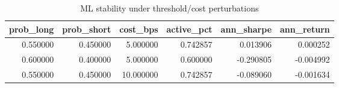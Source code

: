 \begin{table}
\caption{ML stability under threshold/cost perturbations}
\label{tab:7_9}
\begin{tabular}{rrrrrr}
\toprule
prob_long & prob_short & cost_bps & active_pct & ann_sharpe & ann_return \\
\midrule
0.550000 & 0.450000 & 5.000000 & 0.742857 & 0.013906 & 0.000252 \\
0.600000 & 0.400000 & 5.000000 & 0.600000 & -0.290805 & -0.004992 \\
0.550000 & 0.450000 & 10.000000 & 0.742857 & -0.089060 & -0.001634 \\
\bottomrule
\end{tabular}
\end{table}
